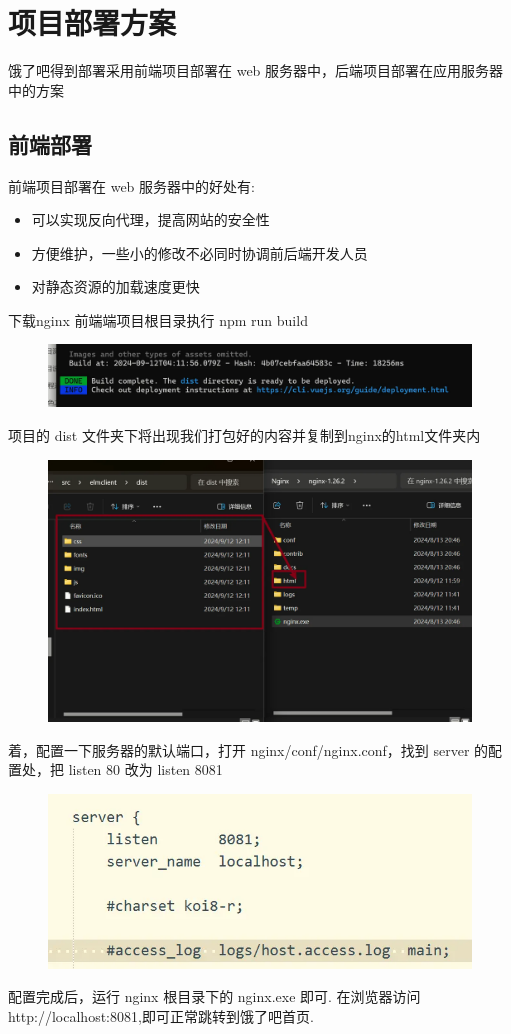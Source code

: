 \chapter{项目部署方案}
 饿了吧得到部署采用前端项目部署在 web 服务器中，后端项目部署在应用服务器中的方案


\section{前端部署}
前端项目部署在 web 服务器中的好处有:
 \begin{itemize}
     \item 可以实现反向代理，提高网站的安全性
     \item 方便维护，一些小的修改不必同时协调前后端开发人员
     \item 对静态资源的加载速度更快
 \end{itemize}
下载nginx
前端端项目根目录执行 npm run build
\begin{figure}[H]
    \centering
    \includegraphics[width=1\linewidth]{pics/部署1.png}
    \label{fig:bs1}
\end{figure}
项目的 dist 文件夹下将出现我们打包好的内容并复制到nginx的html文件夹内
\begin{figure}[H]
    \centering
    \includegraphics[width=1\linewidth]{pics/部署2.png}
\end{figure}
着，配置一下服务器的默认端口，打开 nginx/conf/nginx.conf，找到 server 的配置处，把 listen 80 改为 listen 8081
\begin{figure}[H]
    \centering
    \includegraphics[width=0.5\linewidth]{pics/部署3.png}
\end{figure}
配置完成后，运行 nginx 根目录下的 nginx.exe 即可.
在浏览器访问 http://localhost:8081,即可正常跳转到饿了吧首页.
